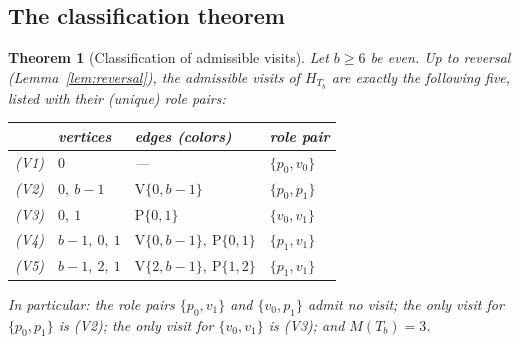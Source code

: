 \documentclass[11pt]{article}
\newtheorem{theorem}{Theorem}[section]
\theoremstyle{definition}
\begin{document}
\subsection{The classification theorem}

\begin{theorem}[Classification of admissible visits]\label{thm:classification}
Let $b \ge 6$ be even. Up to reversal (Lemma~\ref{lem:reversal}), the admissible
visits of $H_{T_b}$ are exactly the following five, listed with their (unique) role
pairs:
\begin{center}
\begin{tabular}{clll}
\toprule
 & vertices & edges (colors) & role pair \\
\midrule
(V1) & $0$ & --- & $\{p_0, v_0\}$ \\
(V2) & $0,\ b-1$ & $\mathrm V\{0,b{-}1\}$ & $\{p_0, p_1\}$ \\
(V3) & $0,\ 1$ & $\mathrm P\{0,1\}$ & $\{v_0, v_1\}$ \\
(V4) & $b-1,\ 0,\ 1$ & $\mathrm V\{0,b{-}1\},\ \mathrm P\{0,1\}$ & $\{p_1, v_1\}$ \\
(V5) & $b-1,\ 2,\ 1$ & $\mathrm V\{2,b{-}1\},\ \mathrm P\{1,2\}$ & $\{p_1, v_1\}$ \\
\bottomrule
\end{tabular}
\end{center}
In particular: the role pairs $\{p_0, v_1\}$ and $\{v_0, p_1\}$ admit no visit;
the only visit for $\{p_0, p_1\}$ is (V2); the only visit for $\{v_0, v_1\}$ is
(V3); and $M(T_b) = 3$.
\end{theorem}
\end{document}
